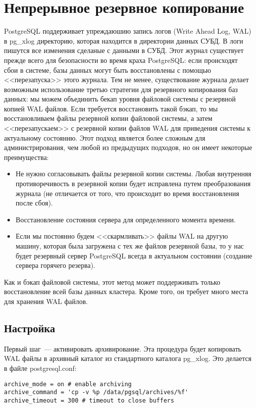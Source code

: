\section{Непрерывное резервное копирование}
PostgreSQL поддерживает упреждаюшию запись логов (Write Ahead Log, WAL) в pg\_xlog директорию, которая находится в директории 
данных СУБД. 
В логи пишутся все изменения сделаные с данными в СУБД. Этот журнал существует прежде всего для безопасности во 
время краха PostgreSQL: если происходят сбои в системе, базы данных могут быть восстановлены с помощью <<перезапуска>> этого 
журнала. Тем не менее, существование журнала делает возможным использование третью стратегии для резервного копирования 
баз данных: мы можем объединить бекап уровня файловой системы с резервной копией WAL файлов. Если требуется восстановить такой бэкап, то 
мы восстановливаем файлы резервной копии файловой системы, а затем <<перезапускаем>> с резервной копии файлов WAL для приведения 
системы к актуальному состоянию. Этот подход является более сложным для администрирования, чем любой из предыдущих подходов, 
но он имеет некоторые преимущества:
\begin{itemize}
\item Не нужно согласовывать файлы резервной копии системы. Любая внутренняя противоречивость в резервной копии будет исправлена 
путем преобразования журнала (не отличается от того, что происходит во время восстановления после сбоя). 
\item Восстановление состояния сервера для определенного момента времени.
\item Если мы постоянно будем <<скармливать>> файлы WAL на другую машину, которая была загружена с тех же файлов резервной базы, 
то у нас будет резервный сервер PostgreSQL всегда в актуальном состоянии (создание сервера горячего резерва).
\end{itemize}

Как и бэкап файловой системы, этот метод может поддерживать только восстановление всей базы данных кластера. Кроме того, он требует 
много места для хранения WAL файлов.

\subsection{Настройка}
Первый шаг~--- активировать архивирование. Эта процедура будет копировать WAL файлы в архивный каталог из 
стандартного каталога pg\_xlog. Это делается в файле postgresql.conf:
\begin{lstlisting}[label=lst:backups15,caption=Настройка архивирования]
archive_mode = on # enable archiving
archive_command = 'cp -v %p /data/pgsql/archives/%f'
archive_timeout = 300 # timeout to close buffers
\end{lstlisting}

